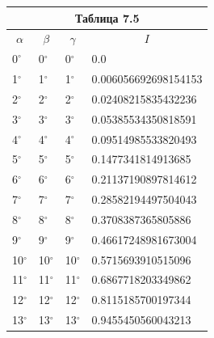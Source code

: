 \documentclass[14pt]{extreport}
\begin{document}
\begin{center}
   \begin{tabular}{ |l|l|l|l| }
   \multicolumn{4}{c}{Таблица 7.5}\\
    \hline
    \multicolumn{1}{|c|}{$\alpha$} & \multicolumn{1}{c|}{$\beta$} & \multicolumn{1}{c|}{$\gamma$} & \multicolumn{1}{c|}{$I$} \\ \hline
    $0^{\circ}$ & 0$^{\circ}$  & 0$^{\circ}$  &0.0    \\ \hline
    1$^{\circ}$ & 1$^{\circ}$  & 1$^{\circ}$  &0.006056692698154153    \\ \hline
    2$^{\circ}$  & 2$^{\circ}$  & 2$^{\circ}$  &0.02408215835432236    \\ \hline
    3$^{\circ}$  & 3$^{\circ}$  & 3$^{\circ}$  &0.05385534350818591    \\ \hline
    4$^{\circ}$  & 4$^{\circ}$  & 4$^{\circ}$  &0.09514985533820493    \\ \hline
    5$^{\circ}$  & 5$^{\circ}$  & 5$^{\circ}$  &0.1477341814913685    \\ \hline
    6$^{\circ}$  & 6$^{\circ}$  & 6$^{\circ}$  & 0.21137190897814612   \\ \hline
    7$^{\circ}$  & 7$^{\circ}$  & 7$^{\circ}$  & 0.28582194497504043   \\ \hline
    8$^{\circ}$  & 8$^{\circ}$  & 8$^{\circ}$  &0.3708387365805886    \\ \hline
    9$^{\circ}$  & 9$^{\circ}$  & 9$^{\circ}$  & 0.46617248981673004   \\ \hline
    10$^{\circ}$  & 10$^{\circ}$  & 10$^{\circ}$  &0.5715693910515096    \\ \hline
    11$^{\circ}$  & 11$^{\circ}$  & 11$^{\circ}$  &0.6867718203349862    \\ \hline
    12$^{\circ}$  & 12$^{\circ}$  & 12$^{\circ}$  &0.8115185700197344    \\ \hline
    13$^{\circ}$  & 13$^{\circ}$  & 13$^{\circ}$  &0.9455450560043213    \\ \hline
    \end{tabular}             
\end{center}
\end{document}
